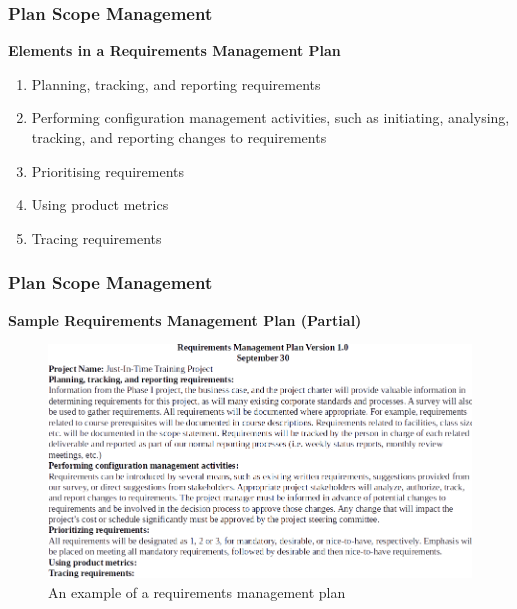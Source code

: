 \documentclass[aspectratio=169]{beamer}
\begin{document}

\begin{frame}
\frametitle{Plan Scope Management}
\begin{tcolorbox}
\textbf{Elements in a Requirements Management Plan}
\begin{enumerate}
\item Planning, tracking, and reporting requirements
\item Performing configuration management activities, such as initiating, analysing, tracking, and reporting changes to requirements
\item Prioritising requirements
\item Using product metrics
\item Tracing requirements
\end{enumerate}
\end{tcolorbox}

\end{frame}


\begin{frame}
\frametitle{Plan Scope Management}
\textbf{Sample Requirements Management Plan (Partial)}
\begin{figure}
\includegraphics[scale=0.45]{req_man}
\vspace{-0.3cm}
\caption{An example of a requirements management plan}
\end{figure}
\end{frame}
\end{document}
